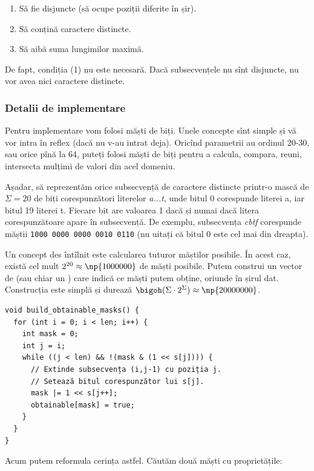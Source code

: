 \begin{enumerate}
  \item Să fie disjuncte (să ocupe poziții diferite în șir).
  \item Să conțină caractere distincte.
  \item Să aibă suma lungimilor maximă.
\end{enumerate}

De fapt, condiția (1) nu este necesară. Dacă subsecvențele nu sînt disjuncte, nu vor avea nici caractere distincte.

\subsubsection*{Detalii de implementare}

Pentru implementare vom folosi măști de biți. Unele concepte sînt simple și vă vor intra în reflex (dacă nu v-au intrat deja). Oricînd parametrii au ordinul 20-30, sau orice pînă la 64, puteți folosi măști de biți pentru a calcula, compara, reuni, intersecta mulțimi de valori din acel domeniu.

Așadar, să reprezentăm orice subsecvență de caractere distincte printr-o mască de $\Sigma = 20$ de biți corespunzători literelor \textit{a...t}, unde bitul 0 corespunde literei a, iar bitul 19 literei t. Fiecare bit are valoarea 1 dacă și numai dacă litera corespunzătoare apare în subsecvență. De exemplu, subsecvența \textit{cbtf} corespunde măștii \texttt{1000 0000 0000 0010 0110} (nu uitați că bitul 0 este cel mai din dreapta).

Un concept des întîlnit este calcularea tuturor măștilor posibile. În acest caz, există cel mult $2^{20} \approx \np{1000000}$ de măști posibile. Putem construi un vector de  (sau chiar un ) care indică ce măști putem obține, oriunde în șirul dat. Construcția este simplă și durează $\bigoh(\Sigma \cdot 2^\Sigma) \approx \np{20000000}$.

\begin{verbatim}
void build_obtainable_masks() {
  for (int i = 0; i < len; i++) {
    int mask = 0;
    int j = i;
    while ((j < len) && !(mask & (1 << s[j]))) {
      // Extinde subsecvența (i,j-1) cu poziția j.
      // Setează bitul corespunzător lui s[j].
      mask |= 1 << s[j++];
      obtainable[mask] = true;
    }
  }
}
\end{verbatim}

Acum putem reformula cerința astfel. Căutăm două măști cu proprietățile:

